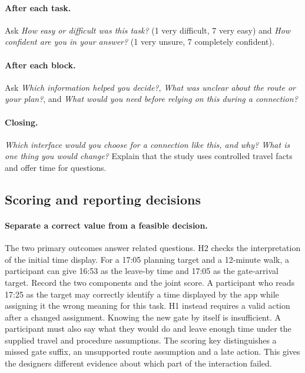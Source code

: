 \documentclass[sigconf,nonacm,balance=false]{acmart}
\begin{document}
\paragraph{After each task.} Ask \emph{How easy or difficult was this task?} (1 very difficult, 7 very easy) and \emph{How confident are you in your answer?} (1 very unsure, 7 completely confident).

\paragraph{After each block.} Ask \emph{Which information helped you decide?}, \emph{What was unclear about the route or your plan?}, and \emph{What would you need before relying on this during a connection?}

\paragraph{Closing.} \emph{Which interface would you choose for a connection like this, and why? What is one thing you would change?} Explain that the study uses controlled travel facts and offer time for questions.

\subsection{Scoring and reporting decisions}
\paragraph{Separate a correct value from a feasible decision.} The two primary outcomes answer related questions. H2 checks the interpretation of the initial time display. For a 17:05 planning target and a 12-minute walk, a participant can give 16:53 as the leave-by time and 17:05 as the gate-arrival target. Record the two components and the joint score. A participant who reads 17:25 as the target may correctly identify a time displayed by the app while assigning it the wrong meaning for this task. H1 instead requires a valid action after a changed assignment. Knowing the new gate by itself is insufficient. A participant must also say what they would do and leave enough time under the supplied travel and procedure assumptions. The scoring key distinguishes a missed gate suffix, an unsupported route assumption and a late action. This gives the designers different evidence about which part of the interaction failed.
\end{document}
